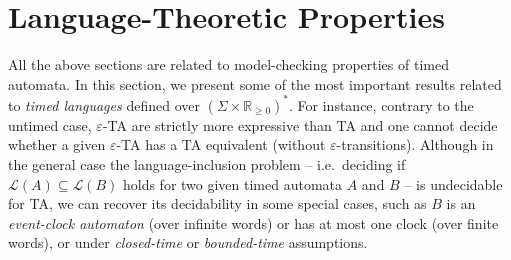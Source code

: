 \documentclass[11pt]{article}
\theoremstyle{definition}
\theoremstyle{remark}
\theoremstyle{definition}
\begin{document}
\section{Language-Theoretic Properties}\label{sec:lang}
All the above sections are related to model-checking properties of timed automata.
In this section, we present some of the most important results related to \emph{timed languages} defined over $(\Sigma \times \mathbb{R}_{\geq 0})^*$.
For instance, contrary to the untimed case, $\varepsilon$-TA are strictly more expressive than TA and one cannot decide whether a given $\varepsilon$-TA has a TA equivalent (without $\varepsilon$-transitions).
Although in the general case the language-inclusion problem -- i.e.\ deciding if $\mathcal{L}(A) \subseteq \mathcal{L}(B)$ holds for two given timed automata $A$ and $B$ -- is undecidable for TA, we can recover its decidability in some special cases, such as $B$ is an \emph{event-clock automaton} (over infinite words) or has at most one clock (over finite words), or under \emph{closed-time} or \emph{bounded-time} assumptions.



\end{document}
